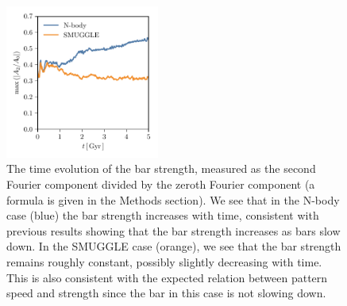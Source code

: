 \documentclass{natureprintstyle}
\begin{document}
\begin{figure}[h]%
\centering
\includegraphics[width=0.45\textwidth]{fig/fig-A2.pdf}
\caption{The time evolution of the bar strength, measured as the second
Fourier component divided by the zeroth Fourier component (a formula is given
in the Methods section). We see that in the N-body case (blue) the bar
strength increases with time, consistent with previous results showing that
the bar strength increases as bars slow down. In the SMUGGLE case (orange), we
see that the bar strength remains roughly constant, possibly slightly
decreasing with time. This is also consistent with the expected relation
between pattern speed and strength since the bar in this case is not slowing
down.}
\label{fig:strength}
\end{figure}
\end{document}
